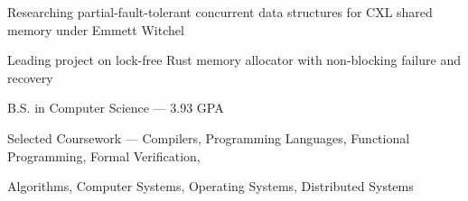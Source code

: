 \documentclass{resume}
\begin{document}
\begin{education}
	\begin{description}
		\item Researching partial-fault-tolerant concurrent data structures for CXL shared memory under Emmett Witchel
		\item Leading project on lock-free Rust memory allocator with non-blocking failure and recovery
	\end{description}

	\begin{description}
		\item B.S. in Computer Science --- 3.93 GPA
		\item Selected Coursework ---
		      Compilers,
		      Programming Languages,
		      Functional Programming,
		      Formal Verification,

		      Algorithms,
		      Computer Systems,
		      Operating Systems,
		      Distributed Systems
	\end{description}
\end{education}
\end{document}
